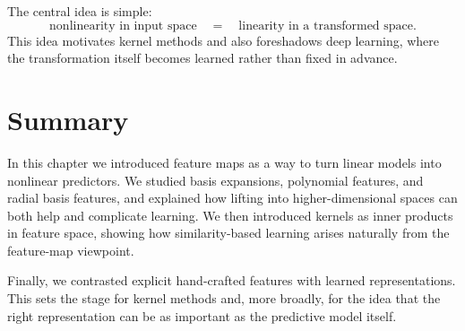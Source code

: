 The central idea is simple:
\[
\text{nonlinearity in input space}
\quad = \quad
\text{linearity in a transformed space}.
\]
This idea motivates kernel methods and also foreshadows deep learning, where the transformation itself becomes learned rather than fixed in advance.

\section{Summary}

In this chapter we introduced feature maps as a way to turn linear models into nonlinear predictors. We studied basis expansions, polynomial features, and radial basis features, and explained how lifting into higher-dimensional spaces can both help and complicate learning. We then introduced kernels as inner products in feature space, showing how similarity-based learning arises naturally from the feature-map viewpoint.

Finally, we contrasted explicit hand-crafted features with learned representations. This sets the stage for kernel methods and, more broadly, for the idea that the right representation can be as important as the predictive model itself.